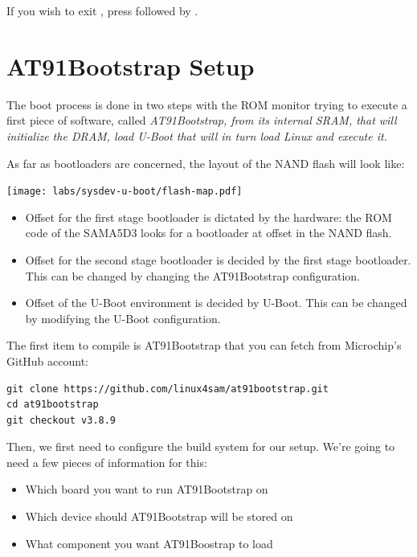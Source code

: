 If you wish to exit , press \code{[Ctrl][a]} followed by
\code{[Ctrl][x]}.

\section{AT91Bootstrap Setup}

The boot process is done in two steps with the ROM monitor trying to
execute a first piece of software, called \em{AT91Bootstrap}, from
its internal SRAM, that will initialize the DRAM, load \em{U-Boot}
that will in turn load Linux and execute it.

As far as bootloaders are concerned, the layout of the NAND flash will
look like:

\begin{center}
  \texttt{[image: labs/sysdev-u-boot/flash-map.pdf]}
\end{center}

\begin{itemize}
\item Offset  for the first stage bootloader is dictated by
  the hardware: the ROM code of the SAMA5D3 looks for a bootloader at
  offset  in the NAND flash.
\item Offset  for the second stage bootloader is decided
  by the first stage bootloader. This can be changed by changing the
  AT91Bootstrap configuration.
\item Offset  of the U-Boot environment is decided by
  U-Boot. This can be changed by modifying the U-Boot configuration.
\end{itemize}

The first item to compile is AT91Bootstrap that you can fetch from
Microchip's GitHub account:

\begin{verbatim}
git clone https://github.com/linux4sam/at91bootstrap.git
cd at91bootstrap
git checkout v3.8.9
\end{verbatim}

Then, we first need to configure the build system for our setup. We're
going to need a few pieces of information for this:

\begin{itemize}
\item Which board you want to run AT91Bootstrap on
\item Which device should AT91Bootstrap will be stored on
\item What component you want AT91Boostrap to load
\end{itemize}

